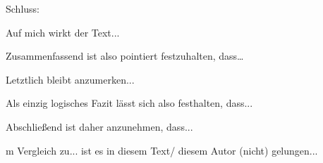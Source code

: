 Schluss:
\begin{compactitem}
    \item  Auf mich wirkt der Text... 
    \item  Zusammenfassend ist also pointiert festzuhalten, dass… 
    \item Letztlich bleibt anzumerken... 
    \item Als einzig logisches Fazit lässt sich also festhalten, dass...
    \item Abschließend ist daher anzunehmen, dass... 
    \item m Vergleich zu... ist es in diesem Text/ diesem Autor (nicht) gelungen... 
\end{compactitem}